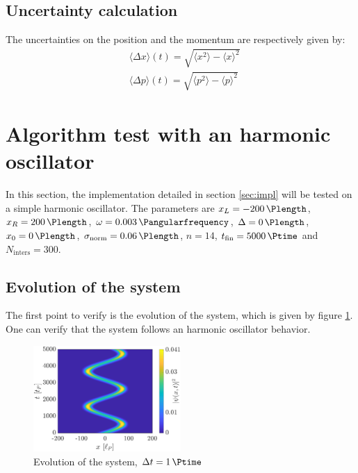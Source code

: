 \documentclass[a4paper,12pt,twoside]{article}
\begin{document}
  \subsection{Uncertainty calculation}
  The uncertainties on the position and the momentum are respectively given by:
  \begin{align}
   &\langle \Delta x\rangle(t) = \sqrt{\langle x^2 \rangle - \langle x \rangle^2}\\
   &\langle \Delta p\rangle(t) = \sqrt{\langle p^2 \rangle - \langle p \rangle^2}
  \end{align}




\newpage
\section{Algorithm test with an harmonic oscillator}\label{sec:har_osc}
  In this section, the implementation detailed in section \ref{sec:impl} will be tested on a simple harmonic oscillator.
  The parameters are $x_L=\SI{-200}{\Plength}$, $x_R=\SI{200}{\Plength}$, $\omega = \SI{0.003}{\Pangularfrequency}$, $\Delta = \SI{0}{\Plength}$, $x_0 = \SI{0}{\Plength}$, $\sigma_\text{norm} = \SI{0.06}{\Plength}$, $n=14$, $t_\text{fin} = \SI{5000}{\Ptime}$ and $N_\text{inters} = 300$.


  \subsection{Evolution of the system}
  The first point to verify is the evolution of the system, which is given by figure \ref{fig:i_evo}.
  One can verify that the system follows an harmonic oscillator behavior.

  \begin{figure}[h]
    \centering
    \includegraphics[width=0.5\textwidth]{graphs/i_evo.eps}
    \caption{Evolution of the system, $\Delta t = \SI{1}{\Ptime}$}
    \label{fig:i_evo}
  \end{figure}
\end{document}
